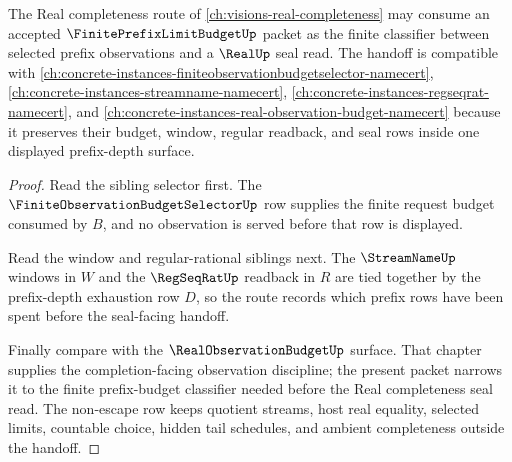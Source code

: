 \begin{theorem}
\label{thm:finite-prefix-limit-budget-real-route-handoff}
The Real completeness route of \autoref{ch:visions-real-completeness} may consume an accepted $\FinitePrefixLimitBudgetUp$ packet as the finite classifier between selected prefix observations and a $\RealUp$ seal read. The handoff is compatible with \autoref{ch:concrete-instances-finiteobservationbudgetselector-namecert}, \autoref{ch:concrete-instances-streamname-namecert}, \autoref{ch:concrete-instances-regseqrat-namecert}, and \autoref{ch:concrete-instances-real-observation-budget-namecert} because it preserves their budget, window, regular readback, and seal rows inside one displayed prefix-depth surface.
\end{theorem}
\begin{proof}
Read the sibling selector first. The $\FiniteObservationBudgetSelectorUp$ row supplies the finite request budget consumed by $B$, and no observation is served before that row is displayed.

Read the window and regular-rational siblings next. The $\StreamNameUp$ windows in $W$ and the $\RegSeqRatUp$ readback in $R$ are tied together by the prefix-depth exhaustion row $D$, so the route records which prefix rows have been spent before the seal-facing handoff.

Finally compare with the $\RealObservationBudgetUp$ surface. That chapter supplies the completion-facing observation discipline; the present packet narrows it to the finite prefix-budget classifier needed before the Real completeness seal read. The non-escape row keeps quotient streams, host real equality, selected limits, countable choice, hidden tail schedules, and ambient completeness outside the handoff.
\end{proof}

